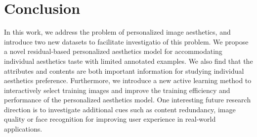 \section{Conclusion}
In this work, we address the problem of personalized image aesthetics, and introduce two new datasets to facilitate investigatio of this problem. We  propose a novel residual-based personalized aesthetics model for accommodating individual aesthetics taste with limited annotated examples. We also find that the attributes and contents are both important information for studying individual aesthetics preference. Furthermore, we introduce a new active learning method to interactively select training images and improve the training efficiency and performance of the personalized aesthetics model. One interesting future research direction is to investigate additional cues such as content redundancy, image quality or face recognition for improving user experience in real-world applications.
